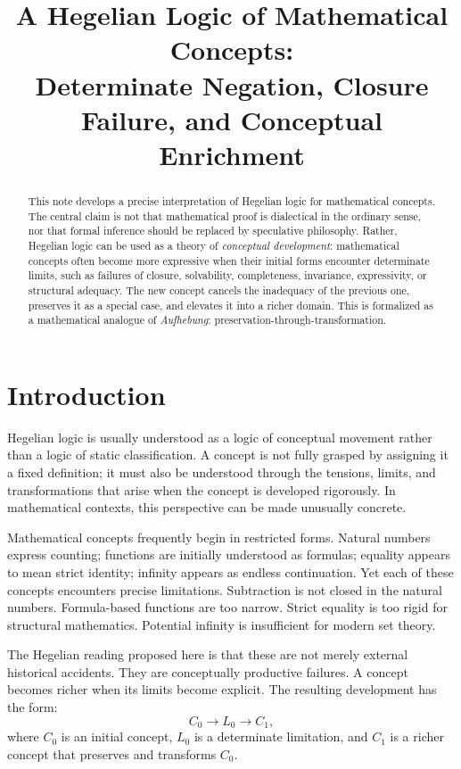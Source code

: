 \documentclass[11pt]{article}
\title{A Hegelian Logic of Mathematical Concepts:\\
Determinate Negation, Closure Failure, and Conceptual Enrichment}
\author{}
\date{}
\begin{document}
\maketitle

\begin{abstract}
This note develops a precise interpretation of Hegelian logic for mathematical concepts. The central claim is not that mathematical proof is dialectical in the ordinary sense, nor that formal inference should be replaced by speculative philosophy. Rather, Hegelian logic can be used as a theory of \emph{conceptual development}: mathematical concepts often become more expressive when their initial forms encounter determinate limits, such as failures of closure, solvability, completeness, invariance, expressivity, or structural adequacy. The new concept cancels the inadequacy of the previous one, preserves it as a special case, and elevates it into a richer domain. This is formalized as a mathematical analogue of \emph{Aufhebung}: preservation-through-transformation.
\end{abstract}

\section{Introduction}

Hegelian logic is usually understood as a logic of conceptual movement rather than a logic of static classification. A concept is not fully grasped by assigning it a fixed definition; it must also be understood through the tensions, limits, and transformations that arise when the concept is developed rigorously. In mathematical contexts, this perspective can be made unusually concrete.

Mathematical concepts frequently begin in restricted forms. Natural numbers express counting; functions are initially understood as formulas; equality appears to mean strict identity; infinity appears as endless continuation. Yet each of these concepts encounters precise limitations. Subtraction is not closed in the natural numbers. Formula-based functions are too narrow. Strict equality is too rigid for structural mathematics. Potential infinity is insufficient for modern set theory.

The Hegelian reading proposed here is that these are not merely external historical accidents. They are conceptually productive failures. A concept becomes richer when its limits become explicit. The resulting development has the form:
\[
C_0 \longrightarrow L_0 \longrightarrow C_1,
\]
where $C_0$ is an initial concept, $L_0$ is a determinate limitation, and $C_1$ is a richer concept that preserves and transforms $C_0$.
\end{document}
